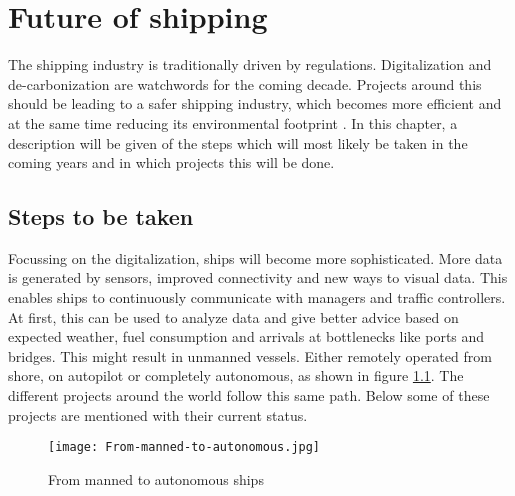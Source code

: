 \chapter{Future of shipping}
\label{sec:future}
The shipping industry is traditionally driven by regulations. Digitalization and de-carbonization are watchwords for the coming decade. Projects around this should be leading to a safer shipping industry, which becomes more efficient and at the same time reducing its environmental footprint \cite{Eriksen2017}. In this chapter, a description will be given of the steps which will most likely be taken in the coming years and in which projects this will be done.

\section{Steps to be taken}
Focussing on the digitalization, ships will become more sophisticated. More data is generated by sensors, improved connectivity and new ways to visual data. This enables ships to continuously communicate with managers and traffic controllers. At first, this can be used to analyze data and give better advice based on expected weather, fuel consumption and arrivals at bottlenecks like ports and bridges.
This might result in unmanned vessels. Either remotely operated from shore, on autopilot or completely autonomous, as shown in figure \ref{fig:From-manned-to-autonomous}. The different projects around the world follow this same path. Below some of these projects are mentioned with their current status.

\begin{figure}[hb]
	\centering
	\texttt{[image: From-manned-to-autonomous.jpg]}
	\caption{From manned to autonomous ships}
	\label{fig:From-manned-to-autonomous}
\end{figure}

